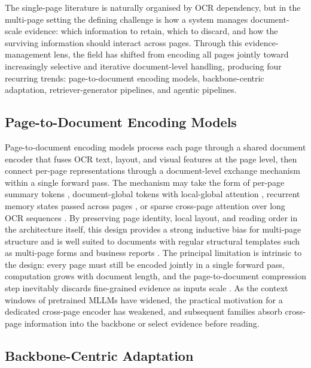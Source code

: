 \documentclass[11pt]{article}
\begin{document}
The single-page literature is naturally organised by OCR dependency, but in the multi-page setting the defining challenge is how a system manages document-scale evidence: which information to retain, which to discard, and how the surviving information should interact across pages. Through this evidence-management lens, the field has shifted from encoding all pages jointly toward increasingly selective and iterative document-level handling, producing four recurring trends: page-to-document encoding models, backbone-centric adaptation, retriever-generator pipelines, and agentic pipelines.

\subsection{Page-to-Document Encoding Models}
\label{sec:arch-p2d}

Page-to-document encoding models process each page through a shared document encoder that fuses OCR text, layout, and visual features at the page level, then connect per-page representations through a document-level exchange mechanism within a single forward pass. The mechanism may take the form of per-page summary tokens \cite{tito2023hierarchical}, document-global tokens with local-global attention \cite{blau2024gram}, recurrent memory states passed across pages \cite{dong2024multipage}, or sparse cross-page attention over long OCR sequences \cite{borchmann2025arctictilt}. By preserving page identity, local layout, and reading order in the architecture itself, this design provides a strong inductive bias for multi-page structure and is well suited to documents with regular structural templates such as multi-page forms and business reports \cite{tito2023hierarchical, borchmann2025arctictilt}. The principal limitation is intrinsic to the design: every page must still be encoded jointly in a single forward pass, computation grows with document length, and the page-to-document compression step inevitably discards fine-grained evidence as inputs scale \cite{blau2024gram, dong2024multipage}. As the context windows of pretrained MLLMs have widened, the practical motivation for a dedicated cross-page encoder has weakened, and subsequent families absorb cross-page information into the backbone or select evidence before reading.

\subsection{Backbone-Centric Adaptation}
\label{sec:arch-bc}
\end{document}
